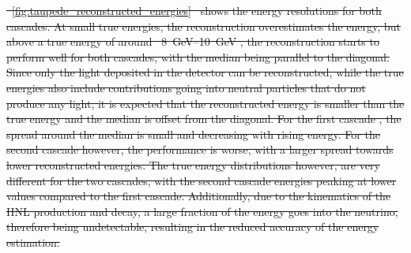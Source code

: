 \documentclass[
    aps,
    prd,
    reprint,
    amsmath,
    amssymb,
    nofootinbib,
    linenumbers,
    superscriptaddress,
    floatfix
]{revtex4-2}
\newcommand{\gev}{\giga\electronvolt}
\providecommand{\DIFdeltex}[1]{{\protect\color{red}\sout{#1}}}                      %
\providecommand{\DIFdel}[1]{\texorpdfstring{\DIFdeltex{#1}}{}} %
\begin{document}
\DIFdel{\mbox{%
\cref{fig:taupede_reconstructed_energies} }\hspace{0pt}%
shows the energy resolutions for both cascades. At small true energies, the reconstruction overestimates the energy, but above a true energy of around \mbox{%
\SIrange{8}{10}{\gev}}\hspace{0pt}%
, the reconstruction starts to perform well for both cascades, with the median being parallel to the diagonal.
Since only the light deposited in the detector can be reconstructed, while the true energies also include contributions going into neutral particles that do not produce any light, it is expected that the reconstructed energy is smaller than the true energy and the median is offset from the diagonal.
For the first cascade , the spread around the median is small and decreasing with rising energy. For the second cascade however, the performance is worse, with a larger spread towards lower reconstructed energies. The true energy distributions however, are very different for the two cascades, with the second cascade energies peaking at lower values compared to the first cascade. Additionally, due to the kinematics of the HNL production and decay, a large fraction of the energy goes into the neutrino, therefore being undetectable, resulting in the reduced accuracy of the energy estimation.
}%

\end{document}
